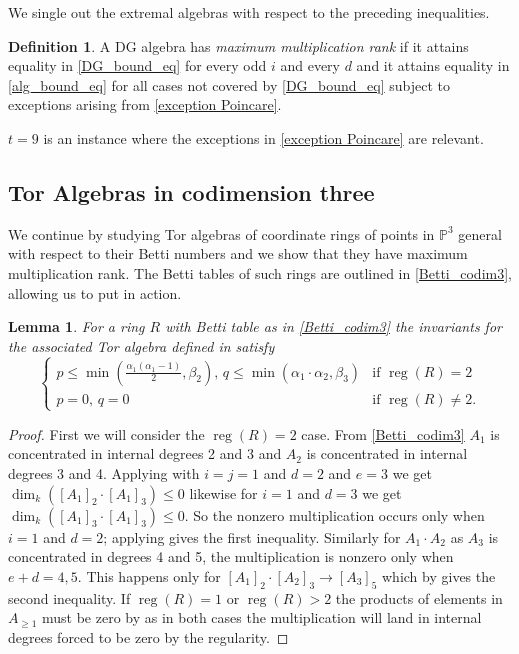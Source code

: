 \documentclass[reqno]{amsart}
\DeclareMathOperator{\rank}{dim}
\DeclareMathOperator{\reg}{reg}
\renewcommand{\P}{\mathbb{P}}
\theoremstyle{plain} %
\newtheorem{lemma}[theorem]{Lemma}
\theoremstyle{definition}
\newtheorem{definition}[theorem]{Definition}
\theoremstyle{remark}
\begin{document}
We single out the extremal algebras with respect to the preceding inequalities.

\begin{definition}
   A DG algebra has {\it maximum multiplication rank} if it attains equality in \eqref{DG_bound_eq} for every odd $i$ and every $d$ and it attains equality in \eqref{alg_bound_eq} for all cases not covered by \eqref{DG_bound_eq} subject to exceptions arising from \eqref{exception Poincare}.   
\end{definition} 
   
     $t=9$ is an instance where the exceptions in \eqref{exception Poincare} are relevant.

\subsection{Tor Algebras in codimension three}

We continue by  studying Tor algebras of coordinate rings of points in $\P^3$ general with respect to their Betti numbers and we show that they have maximum multiplication rank. The Betti tables of such rings are outlined in  \eqref{Betti_codim3}, allowing us to put  in action.

\begin{lemma}\label{bounds_for_codim3}
    For a  ring $R$ with Betti table as in \eqref{Betti_codim3} the invariants for the associated Tor algebra defined in  satisfy   $$\begin{cases}
    p\leq \min\left(\textstyle{\frac{\alpha_1(\alpha_1-1)}{2}},\beta_2\right), \, q\leq \min(\alpha_1\cdot\alpha_2,\beta_3) & \text{if }\reg(R)=2\\ 
    p=0,\, q=0 & \text{if }\reg(R)\neq 2. \end{cases}$$ 
\end{lemma}
 \begin{proof}
 First we will consider the $\reg(R)=2$ case. From \eqref{Betti_codim3} $A_1$ is concentrated in internal degrees 2 and 3 and $A_2$ is concentrated in internal degrees 3 and 4. Applying  with $i=j=1$ and $d=2$ and $e=3$ we get $\rank_k([A_1]_2\cdot [A_1]_3)\leq 0$ likewise for $i=1$ and $d=3$ we get $\rank_k([A_1]_3\cdot [A_1]_3)\leq 0$. So the nonzero multiplication occurs only when $i=1$ and $d=2$; applying  gives the first inequality. Similarly for $A_1\cdot A_2$ as $A_3$ is concentrated in degrees 4 and 5, the multiplication is nonzero only when $e+d=4,5$. This happens only for $[A_1]_2\cdot [A_2]_3\to  [A_3]_5$ which by  gives the second inequality.  If $\reg(R)=1$ or $\reg(R)>2$ the products of elements in $A_{\geq 1}$ must be zero by  as in both cases the multiplication will land in  internal degrees forced to be zero by the regularity.

 \end{proof}
 
\end{document}
